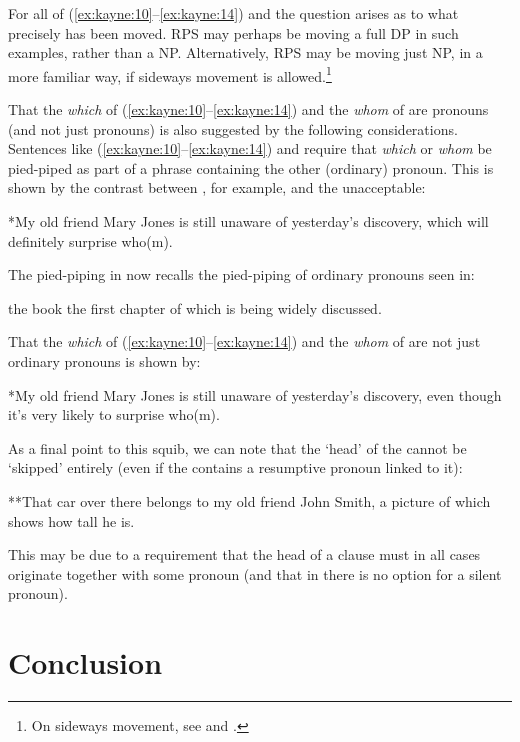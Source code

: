 \documentclass[output=paper]{LSP/langsci}
\begin{document}
     For all of (\ref{ex:kayne:10}--\ref{ex:kayne:14}) and  the {question} arises as to what precisely has been moved.  RPS may perhaps be moving a full DP in such examples, rather than a NP.  Alternatively, RPS may be moving just NP, in a more familiar way, if sideways movement is allowed.\footnote{On sideways movement, see \citet{BobaljikBrown1997} and \citet{Nunes2001}.}

     That the \textit{which} of (\ref{ex:kayne:10}--\ref{ex:kayne:14}) and the \textit{whom} of  are  pronouns (and not just pronouns) is also suggested by the following considerations.  Sentences like (\ref{ex:kayne:10}--\ref{ex:kayne:14}) and  require that \textit{which} or \textit{whom} be pied-piped as part of a phrase containing the other (ordinary)  pronoun.  This is shown by the contrast between , for example, and the unacceptable:

\ea\label{ex:kayne:18}
   *My old friend Mary Jones is still unaware of yesterday’s discovery, which will definitely surprise who(m).
\z

The pied-piping in  now recalls the pied-piping of ordinary  pronouns seen in:

\ea\label{ex:kayne:19}
   the book the first chapter of which is being widely discussed.
\z

That the \textit{which} of (\ref{ex:kayne:10}--\ref{ex:kayne:14}) and the \textit{whom} of  are not just ordinary pronouns is shown by:

\ea\label{ex:kayne:20}
   *My old friend Mary Jones is still unaware of yesterday’s discovery, even though it’s very likely to surprise who(m).
\z

     As a final point to this squib, we can note that the ‘head’ of the  cannot be ‘skipped’ entirely (even if the  contains a resumptive pronoun linked to it):

\ea\label{ex:kayne:21}
   **That car over there belongs to my old friend John Smith, a picture of which shows how tall he is.
\z

This may be due to a requirement that the head of a  clause must in all cases originate together with some  pronoun (and that in  there is no option for a silent  pronoun).

\section{Conclusion}
\end{document}
